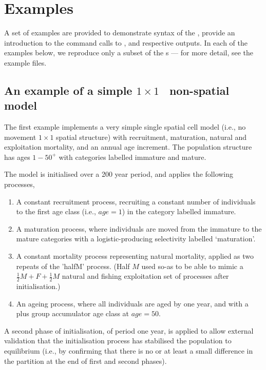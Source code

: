 
\section{Examples\label{sec:examples}}

A set of examples are provided to demonstrate syntax of the \config, provide an introduction to the command calls to \SPM, and respective outputs. In each of the examples below, we reproduce only a subset of the \config s --- for more detail, see the example files.

\subsection{An example of a simple
  \texorpdfstring{$ 1 \times 1 $}{%
    1 x 1
  }%
\ non-spatial model\label{example1}} 

The first example implements a very simple single spatial cell model (i.e., no movement $1 \times 1$ spatial structure) with recruitment, maturation, natural and exploitation mortality, and an annual age increment. The population structure has ages $1-50^{+}$ with categories labelled immature and mature. 

The model is initialised over a 200 year period, and applies the following processes,

\begin{enumerate}
\item A constant recruitment process, recruiting a constant number of individuals to the first age class (i.e., $age=1$) in the category labelled immature.
\item A maturation process, where individuals are moved from the immature to the mature categories with a logistic-producing selectivity labelled `maturation'.
\item A constant mortality process representing natural mortality, applied as two repeats of the 'halfM' process. (Half $M$ used so-as to be able to mimic a $\frac{1}{2} M + F + \frac{1}{2} M$ natural and fishing exploitation set of processes after initialisation.)
\item An ageing process, where all individuals are aged by one year, and with a plus group accumulator age class at $age=50$.
\end{enumerate}

A second phase of initialisation, of period one year, is applied to allow external validation that the initialisation process has stabilised the population to equilibrium (i.e., by confirming that there is no or at least a small difference in the partition at the end of first and second phases).

